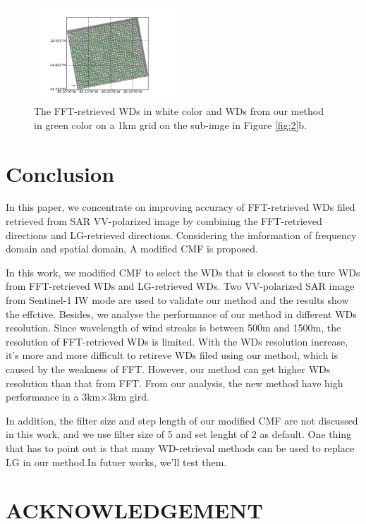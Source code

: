 \documentclass{article}
\begin{document}
\begin{figure}[htpb]
  \centering
  \centerline{\includegraphics[width=0.48\textwidth]{2_wind_a_1_3.png}}
  \caption{The FFT-retrieved WDs in white color and WDs from our method in green color on a 1km grid on the sub-imge in Figure \ref{fig:2}b.}
  \setlength{\belowcaptionskip}{-0.3cm}
  \label{fig:3}
\end{figure}
\section{Conclusion}
\label{sec:conclusion}{}
In this paper, we concentrate on improving accuracy of FFT-retrieved WDs filed retrieved from SAR VV-polarized image by combining the FFT-retrieved directions and LG-retrieved directions. Considering the imformation of frequency domain and spatial domain, A modified CMF is proposed. 

In this work, we modified CMF to select the WDs that is closest to the ture WDs from FFT-retrieved WDs and LG-retrieved WDs. Two VV-polarized SAR image from Sentinel-1 IW mode are used to validate our method and the results show the effctive. Besides, we analyse the performance of our method in different WDs resolution. Since wavelength of wind streaks is between 500m and 1500m, the resolution of FFT-retrieved WDs is limited. With the WDs resolution increase, it's more and more difficult to retireve WDs filed using our method, which is caused by the weakness of FFT. However, our method can get higher WDs resolution than that from FFT. From our analysis, the new method have high performance in a 3km$\times$3km gird.

In addition, the filter size and step length of our modified CMF are not discussed in this work, and we use filter size of 5 and set lenght of 2 as default. One thing that has to point out is that many WD-retrieval methods can be used to replace LG in our method.In futuer works, we'll test them.

\section{ACKNOWLEDGEMENT} %
\label{sec:acknow}
\end{document}
